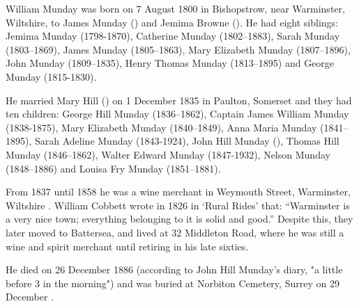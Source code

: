 
William Munday was born on 7 August 1800 \cite{WillMundayBirth} in Bishopstrow, near Warminster, Wiltshire, to James Munday () and Jemima Browne ().  He had eight siblings:  Jemima Munday (1798-1870), Catherine Munday (1802--1883), Sarah Munday (1803--1869), James Munday (1805--1863), Mary Elizabeth Munday (1807--1896), John Munday (1809--1835), Henry Thomas Munday (1813--1895) and George Munday (1815-1830).

He married Mary Hill () on 1 December 1835 in Paulton, Somerset and they had ten children:  George Hill Munday (1836--1862), Captain James William Munday (1838-1875), Mary Elizabeth Munday (1840--1849), Anna Maria Munday (1841--1895), Sarah Adeline Munday (1843-1924), John Hill Munday (), Thomas Hill Munday (1846--1862), Walter Edward Munday (1847-1932), Nelson Munday (1848--1886) and Louisa Fry Munday (1851--1881).

From 1837 until 1858 he was a wine merchant in Weymouth Street, Warminster, Wiltshire \cite{WillMundayOccupation}. William Cobbett wrote in 1826 in `Rural Rides' that: ``Warminster is a very nice town; everything belonging to it is solid and good.'' Despite this, they later moved to Battersea, and lived at 32 Middleton Road, where he was still a wine and spirit merchant until retiring in his late sixties.\cite{WillMundayBattersea}

He died on 26 December 1886 (according to John Hill Munday's diary, "a little before 3 in the morning") and was buried at Norbiton Cemetery, Surrey on 29 December \cite{WillMundayDeath}.



